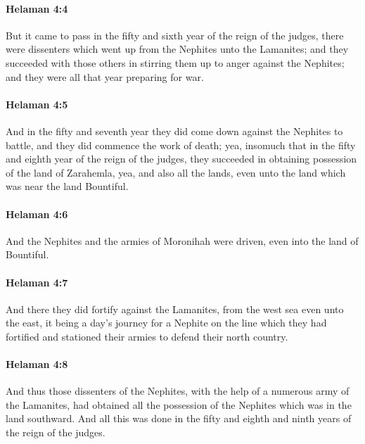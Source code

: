 		\paragraph{Helaman 4:4} %
			\label{HELAMAN-4-4}

			But it came to pass in the fifty and sixth year of the reign of the judges,
			there were dissenters which went up from the Nephites unto the Lamanites;
			and they succeeded with those others
			in stirring them up to anger against the Nephites;
			and they were all that year preparing for war.

		\paragraph{Helaman 4:5} %
			\label{HELAMAN-4-5}

			And in the fifty and seventh year
			they did come down against the Nephites to battle,
			and they did commence the work of death;
			yea, insomuch that in the fifty and eighth year of the reign of the judges,
			they succeeded in obtaining possession of the land of Zarahemla,
			yea, and also all the lands, even unto the land which was near the land Bountiful.

		\paragraph{Helaman 4:6} %
			\label{HELAMAN-4-6}

			And the Nephites and the armies of Moronihah were driven,
			even into the land of Bountiful.

		\paragraph{Helaman 4:7} %
			\label{HELAMAN-4-7}

			And there they did fortify against the Lamanites,
			from the west sea even unto the east,
			it being a day's journey for a Nephite on the line
			which they had fortified and stationed their armies to defend their north country.

		\paragraph{Helaman 4:8} %
			\label{HELAMAN-4-8}

			And thus those dissenters of the Nephites,
			with the help of a numerous army of the Lamanites,
			had obtained all the possession of the Nephites
			which was in the land southward.
			And all this was done in the fifty and eighth and ninth years
			of the reign of the judges.

